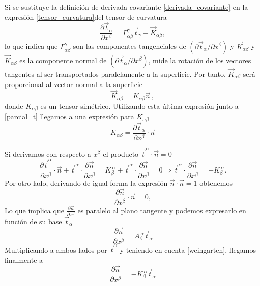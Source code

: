 Si se sustituye la definición de derivada covariante \eqref{derivada_covariante} en la expresión
\eqref{tensor_curvatura}del tensor de curvatura 
\begin{equation}\label{parcial_t}
\frac{\partial \vec{t}_{\alpha}}{\partial x^{\beta}}=\Gamma^{\gamma}_{\alpha\beta}\vec{t}_{\gamma}+\vec{K}_{\alpha\beta},
\end{equation}
lo que indica que $\Gamma^{\gamma}_{\alpha\beta}$ son las componentes tangenciales de
$(\partial \vec{t}_{\alpha}/\partial x^{\beta})$ y $\vec{K}_{\alpha\beta}$ y 
$\vec{K}_{\alpha\beta}$ es la componente normal de $(\partial
\vec{t}_{\alpha}/\partial x^{\beta})$, mide la rotación de los vectores
tangentes al ser transportados paralelamente a la superficie. Por tanto,
 $\vec{K}_{\alpha\beta}$ será proporcional al vector normal a la superficie
\begin{equation*}
 \vec{K}_{\alpha\beta}=K_{\alpha\beta}\vec{n}\, ,
\end{equation*}
donde $K_{\alpha\beta}$ es un tensor simétrico. Utilizando esta última
expresión junto a \eqref{parcial_t} llegamos a una expresión para
$K_{\alpha\beta}$
\begin{equation}\label{K_alfa_beta}
K_{\alpha\beta}=\frac{\partial \vec{t}_{\alpha}}{\partial x^{\beta}}\cdot\vec{n} 
\end{equation}

Si derivamos con respecto a $x^{\beta}$ el producto $\vec{t}^{\alpha}\cdot\vec{n}=0$
\begin{equation}\label{weingarten}
\frac{\partial \vec{t}^{\alpha}}{\partial x^{\beta}}\cdot\vec{n}+
\vec{t}^{\alpha}\cdot\frac{\partial \vec{n}}{\partial x^{\beta}}=
K_{\beta}^{\ \alpha}+\vec{t}^{\alpha}\cdot\frac{\partial \vec{n}}{\partial x^{\beta}}=0
\Rightarrow \vec{t}^{\alpha}\cdot\frac{\partial \vec{n}}{\partial x^{\beta}}=-K_{\beta}^{\ \alpha}.
\end{equation}
Por otro lado, derivando de igual forma la expresión $\vec{n}\cdot\vec{n}=1$ obtenemos 
\begin{equation*}
\frac{\partial \vec{n}}{\partial x^{\beta} }\cdot \vec{n}=0,
\end{equation*}
Lo que implica que $\frac{\partial \vec{n}}{\partial x^{\beta}}$ es paralelo
al plano tangente y podemos expresarlo en función de su base $\vec{t}_{\alpha}$
\begin{equation*}
\frac{\partial \vec{n}}{\partial x^{\beta}}=A_{\beta}^{\ \alpha}\vec{t}_{\alpha}
\end{equation*}
Multiplicando a ambos lados por $\vec{t}^{\gamma}$ y teniendo en cuenta
\eqref{weingarten}, llegamos finalmente a 
\begin{equation}
\frac{\partial \vec{n}}{\partial x^{\beta}}=-K_{\beta}^{\ \alpha}\vec{t}_{\alpha}
\end{equation}

